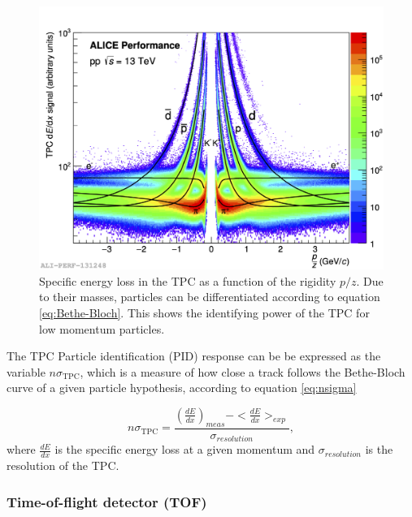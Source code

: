 \begin{figure}
    \centering
    \includegraphics[width=\textwidth]{figures/Ali_TPC_performance_pp.png}
    \caption{Specific energy loss in the TPC as a function of the rigidity $p/z$. Due to their masses, particles can be differentiated according to equation \ref{eq:Bethe-Bloch}. This shows the identifying power of the TPC for low momentum particles.}
    \label{fig:PID_TPC}
\end{figure}

The TPC Particle identification (PID) response can be be expressed as the variable $n\sigma_{\mathrm{TPC}}$, which is a measure of how close a track follows the Bethe-Bloch curve of a given particle hypothesis, according to equation \ref{eq:nsigma}

\begin{equation}\label{eq:nsigma}
    n\sigma_{\mathrm{TPC}} = \frac{(\frac{dE}{dx})_{meas} - <\frac{dE}{dx}>_{exp}}{\sigma_{resolution}},
\end{equation}
where $\frac{dE}{dx}$ is the specific energy loss at a given momentum and $\sigma_{resolution}$ is the resolution of the TPC. 

\subsubsection{Time-of-flight detector (TOF)}

